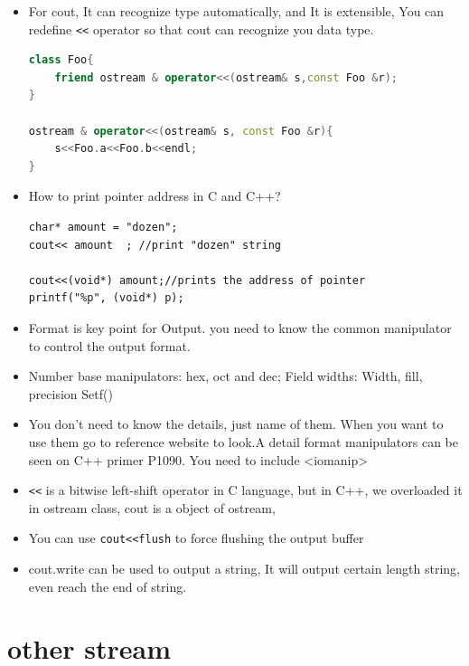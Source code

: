 \documentclass[a4paper,11pt,twoside]{book}
\begin{document}
\begin{itemize}
	\item For cout, It can recognize type automatically, and It is extensible, You can redefine \verb=<<= operator so that cout can recognize you data type.
\begin{lstlisting}[frame=single, language=c++]
class Foo{
	friend ostream & operator<<(ostream& s,const Foo &r);
}
	
ostream & operator<<(ostream& s, const Foo &r){
	s<<Foo.a<<Foo.b<<endl;
}
\end{lstlisting}
	
	\item  How to print pointer address in C and C++?
\begin{lstlisting}[numbers=none]
char* amount = "dozen";
cout<< amount  ; //print "dozen" string
	
cout<<(void*) amount;//prints the address of pointer
printf("%p", (void*) p);
\end{lstlisting}
	
	
	\item Format is key point for Output. you need to know the common manipulator to control the output format.
	\item Number base manipulators:  hex, oct  and dec; Field widths: Width,  fill, precision Setf()
	\item You don't need to know the details, just name of them. When you want to use them go to reference website to look.A detail format manipulators can be seen on C++ primer P1090. You need to include <iomanip>
	
	\item \verb=<<= is a bitwise left-shift operator in C language, but in C++, we overloaded it in ostream class, cout is a object of ostream,
	
	\item You can use \verb=cout<<flush= to force flushing the output buffer
	\item cout.write can be used to output a string, It will output certain length string, even reach the end of string.
	
	
\end{itemize}

\section{other stream}
\end{document}
